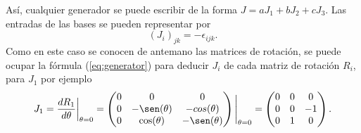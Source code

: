 Así, cualquier generador se puede escribir de la forma $J = aJ_1+ bJ_2+cJ_3$. Las entradas de las bases se pueden representar por
\begin{equation*}
  (J_i)_{jk} = -\epsilon_{ijk}.
\end{equation*}
Como en este caso se conocen de antemano las matrices de rotación, se puede ocupar la fórmula (\ref{eq:generator}) para deducir $J_i$ de cada matriz de rotación $R_i$, para $J_1$ por ejemplo
\begin{equation*}
  J_1 = \frac{dR_1}{d\theta}\bigg|_{\theta=0} = \begin{pmatrix}
    0 & 0 & 0 \\ 0 & -\sen(\theta) & -cos(\theta)\\ 0 & \cos(\theta) & -\sen(\theta)
  \end{pmatrix} \Bigg|_{\theta=0} = \begin{pmatrix}
    0 & 0 & 0 \\ 0&0&-1\\ 0&1&0
  \end{pmatrix}.
\end{equation*}
